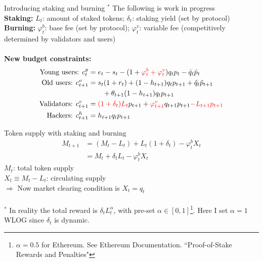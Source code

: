 \documentclass{beamer}
\begin{document}
\begin{frame}{Introducing staking and burning}
$^*$ The following is work in progress\\

\textbf{Staking:}
$L_t$: amount of staked tokens; $\delta_t$: staking yield (set by protocol)\\
\textbf{Burning:}
$\varphi_t^b$: base fee (set by protocol); $\varphi_t^v$: variable fee (competitively determined by validators and users)\\
\ \\
\textbf{New budget constraints:}
\begin{align}
    \text{Young users: } c_t^y &= e_t - s_t - (1+{\color{red} \varphi_t^b+\varphi_t^v}) q_t p_t - \hat{q}_t \hat{p}_t\\
    \text{Old users: } c_{t+1}^o &=  s_t (1+r_t) + (1-h_{t+1}) q_t p_{t+1} + \hat{q}_t \hat{p}_{t+1} \nonumber \\
     &\hspace{2em} + \theta_{t+1} (1-h_{t+1}) q_t p_{t+1}\\ 
    \text{Validators: } c_{t+1}^v &= {\color{red} (1+\delta_t) L_t} p_{t+1} + {\color{red} \varphi_{t+1}^v} q_{t+1} p_{t+1} {\color{red} - L_{t+1} p_{t+1} }\\
    \text{Hackers: } c_{t+1}^h &= h_{t+1} q_t p_{t+1}
\end{align}
\end{frame}


\begin{frame}{Token supply with staking and burning}
\begin{align}
    M_{t+1} &= (M_t - L_t) + L_t (1 + \delta_t) - \varphi_t^b X_t \nonumber \\
    &= M_t + \delta_t L_t - \varphi_t^b X_t
\end{align}
$M_t$: total token supply\\
$X_t \equiv M_t - L_t$: circulating supply \\
\quad $\Rightarrow$ Now market clearing condition is $X_t=q_t$\\
\ \\
$^*$ In reality the total reward is $\delta_t L_t^\alpha$, with pre-set $\alpha\in [0,1]$\footnote{$\alpha=0.5$ for Ethereum. See Ethereum Documentation. ``Proof-of-Stake Rewards and Penalties"}. Here I set $\alpha=1$ WLOG since $\delta_t$ is dynamic.
\end{frame}
\end{document}
